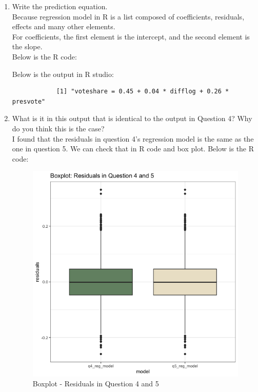\documentclass[12pt,letterpaper]{article}
\begin{document}
\begin{enumerate}
		\newpage
		
		\item Write the prediction equation. \\ 
		
		Because regression model in R is a list composed of coefficients, residuals, effects and many other elements. \\
		
		For coefficients, the first element is the intercept, and the second element is the slope. \\
		
		Below is the R code:
		
		
		Below is the output in R studio:
		\begin{verbatim}
			[1] "voteshare = 0.45 + 0.04 * difflog + 0.26 * presvote"
		\end{verbatim}

		\item What is it in this output that is identical to the output in Question 4? Why do you think this is the case? \\
		
		I found that the residuals in question 4's regression model is the same as the one in question 5. We can check that in R code and box plot. Below is the R code: \\
		
		
		\begin{figure}[h]
			\centering
			\caption{Boxplot - Residuals in Question 4 and 5}
			\includegraphics[scale=0.5]{q5_boxplot.png}
		\end{figure}
		

\end{enumerate}
\end{document}
